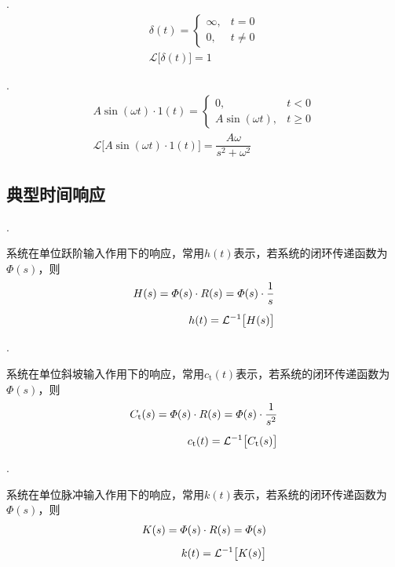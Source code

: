 . 
\begin{align}
	\delta (t) = 
	\begin{cases}
		\infty, & t=0 \\
		0, & t \neq 0
	\end{cases}\\[0.5em]
	\mathcal{L}\big[\delta (t)\big] = 1
\end{align}

. 
\begin{align}
	A\sin(\omega t) \cdot 1(t) = 
	\begin{cases}
		0, & t<0 \\
		A\sin(\omega t), & t \ge 0
	\end{cases}\\[0.5em]
	\mathcal{L}\big[A\sin(\omega t) \cdot 1(t)\big] = \dfrac{A \omega }{s^2 + \omega^2}
\end{align}

\subsection{典型时间响应}
. 
\par 系统在单位跃阶输入作用下的响应，常用$h(t)$表示，若系统的闭环传递函数为$\varPhi (s)$，则
\begin{align}
	H(s) = \varPhi(s) \cdot R(s) = \varPhi(s) \cdot \dfrac{1}{s} \notag \\[0.5em]
	h(t) = \mathcal{L}^{-1}\big[H(s)\big]\label{XY1}
\end{align}

. 
\par 系统在单位斜坡输入作用下的响应，常用$c_{\text{t}}(t)$表示，若系统的闭环传递函数为$\varPhi (s)$，则
\begin{align}
	C_{\text{t}}(s) = \varPhi(s) \cdot R(s) = \varPhi(s) \cdot \dfrac{1}{s^2} \notag \\[0.5em]
	c_{\text{t}}(t) = \mathcal{L}^{-1}\big[C_\text{t}(s)\big]\label{XY2}
\end{align}

. 
\par 系统在单位脉冲输入作用下的响应，常用$k(t)$表示，若系统的闭环传递函数为$\varPhi (s)$，则
\begin{align}
	K(s) = \varPhi(s) \cdot R(s) = \varPhi(s) \notag \\[0.5em]
	k(t) = \mathcal{L}^{-1}\big[K(s)\big]\label{XY3}
\end{align}

